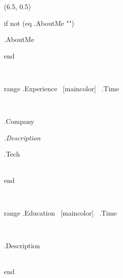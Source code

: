 \begin{textblock}{14.5}(6.5, 0.5)
\newlength\indentLength
\pgfmathsetlength{\indentLength}{5mm}
\newlength\outsidePageLength
\pgfmathsetlength{\outsidePageLength}{140mm}
\newlength\insidePageLength
\pgfmathsetlength{\insidePageLength}{135mm}

{{if not (eq .AboutMe "")}}

{{.AboutMe}}

\bigskip

{{end}}


\begin{minipage}{\indentLength}
~
\end{minipage}
\begin{minipage}{\outsidePageLength}
    {{range .Experience}}
        {} ~\xrfill[0.0ex]{0.5pt}[maincolor]~ {{.Time}}

        \smallskip

        \begin{minipage}{\indentLength}
        ~
        \end{minipage}
        \begin{minipage}{\insidePageLength}
            {{.Company}}

            \smallskip

           {\itshape {{.Description}}}

            \smallskip

            {{.Tech}}
        \end{minipage} \\[2ex]
    {{end}}
\end{minipage}

\bigskip



\begin{minipage}{\indentLength}
~
\end{minipage}
\begin{minipage}{\outsidePageLength}
    {{range .Education}}
        {} ~\xrfill[0.0ex]{0.5pt}[maincolor]~ {{.Time}}

        \smallskip

        \begin{minipage}{\indentLength}
        ~
        \end{minipage}
        \begin{minipage}{\insidePageLength}
           {{.Description}}

        \end{minipage} \\[2ex]
    {{end}}
\end{minipage}

\end{textblock}
